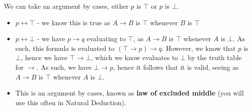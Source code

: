 \documentclass[a4paper, 12pt]{article}
\begin{document}
                We can take an argument by cases, either $p$ is $\top$ or $p$ is $\bot$.
                \begin{itemize}
                    \itemsep0em
                    \item $p \leftrightarrow \top$ - we know this is true as $A \rightarrow B$ is $\top$ whenever $B$ is $\top$
                    \item $p \leftrightarrow \bot$ - we have $p \rightarrow q$ evaluating to $\top$, as $A \rightarrow B$ is $\top$ whenever $A$ is $\bot$. As such, this formula is evaluated to $(\top \rightarrow p) \rightarrow q$. However, we know that $p$ is $\bot$, hence we have $\top \rightarrow \bot$, which we know evaluates to $\bot$ by the truth table for $\rightarrow$. As such, we have $\bot \rightarrow p$, hence it follows that it is valid, seeing as $A \rightarrow B$ is $\top$ whenever $A$ is $\bot$.
                    \item This is an argument by cases, known as \textbf{law of excluded middle} (you will use this often in Natural Deduction).
                \end{itemize}
\end{document}
